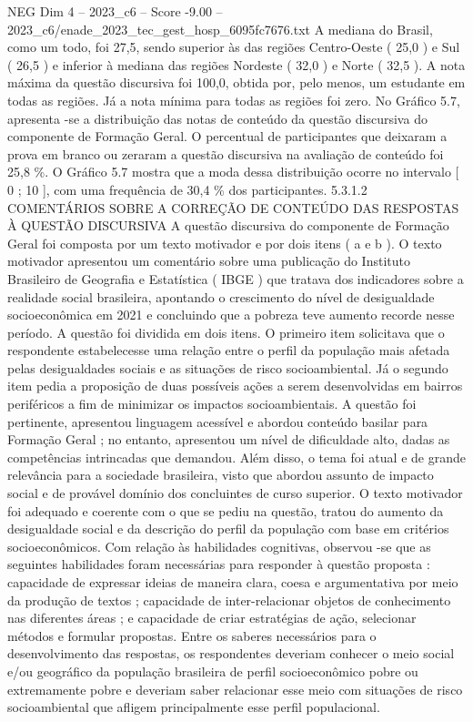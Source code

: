 \begin{textsample}{NEG Dim 4 – 2023\_c6 – Score -9.00 – 2023\_c6/enade\_2023\_tec\_gest\_hosp\_6095fc7676.txt}
A mediana do Brasil, como um todo, foi 27,5, sendo superior às das regiões Centro-Oeste ( 25,0 ) e Sul ( 26,5 ) e inferior à mediana das regiões Nordeste ( 32,0 ) e Norte ( 32,5 ).
A nota máxima da questão discursiva foi 100,0, obtida por, pelo menos, um estudante em todas as regiões.
Já a nota mínima para todas as regiões foi zero.
No Gráfico 5.7, apresenta -se a distribuição das notas de conteúdo da questão discursiva do componente de Formação Geral.
O percentual de participantes que deixaram a prova em branco ou zeraram a questão discursiva na avaliação de conteúdo foi 25,8 \%.
O Gráfico 5.7 mostra que a moda dessa distribuição ocorre no intervalo [ 0 ; 10 ], com uma frequência de 30,4 \% dos participantes. 5.3.1.2 COMENTÁRIOS SOBRE A CORREÇÃO DE CONTEÚDO DAS RESPOSTAS À QUESTÃO DISCURSIVA A questão discursiva do componente de Formação Geral foi composta por um texto motivador e por dois itens ( a e b ).
O texto motivador apresentou um comentário sobre uma publicação do Instituto Brasileiro de Geografia e Estatística ( IBGE ) que tratava dos indicadores sobre a realidade social brasileira, apontando o crescimento do nível de desigualdade socioeconômica em 2021 e concluindo que a pobreza teve aumento recorde nesse período.
A questão foi dividida em dois itens.
O primeiro item solicitava que o respondente estabelecesse uma relação entre o perfil da população mais afetada pelas desigualdades sociais e as situações de risco socioambiental.
Já o segundo item pedia a proposição de duas possíveis ações a serem desenvolvidas em bairros periféricos a fim de minimizar os impactos socioambientais.
A questão foi pertinente, apresentou linguagem acessível e abordou conteúdo basilar para Formação Geral ; no entanto, apresentou um nível de dificuldade alto, dadas as competências intrincadas que demandou.
Além disso, o tema foi atual e de grande relevância para a sociedade brasileira, visto que abordou assunto de impacto social e de provável domínio dos concluintes de curso superior.
O texto motivador foi adequado e coerente com o que se pediu na questão, tratou do aumento da desigualdade social e da descrição do perfil da população com base em critérios socioeconômicos.
Com relação às habilidades cognitivas, observou -se que as seguintes habilidades foram necessárias para responder à questão proposta : capacidade de expressar ideias de maneira clara, coesa e argumentativa por meio da produção de textos ; capacidade de inter-relacionar objetos de conhecimento nas diferentes áreas ; e capacidade de criar estratégias de ação, selecionar métodos e formular propostas.
Entre os saberes necessários para o desenvolvimento das respostas, os respondentes deveriam conhecer o meio social e/ou geográfico da população brasileira de perfil socioeconômico pobre ou extremamente pobre e deveriam saber relacionar esse meio com situações de risco socioambiental que afligem principalmente esse perfil populacional.

\end{textsample}
